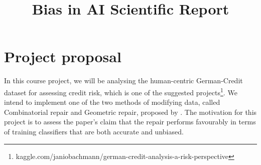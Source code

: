 \documentclass[conference]{IEEEtran}
\begin{document}
\title{Bias in AI Scientific Report}


\maketitle




\section{Project proposal}

In this course project, we will be analysing the human-centric German-Credit dataset for assessing credit risk, which is one of the suggested projects\footnote{kaggle.com/janiobachmann/german-credit-analysis-a-risk-perspective}. We intend to implement one of the two methods of modifying data, called Combinatorial repair
and Geometric repair, proposed by \cite{Feldman2015ComputationalFP}. The motivation for this project is to assess the paper's claim that the repair performs favourably in terms of training classifiers that are both accurate and unbiased.
\end{document}
